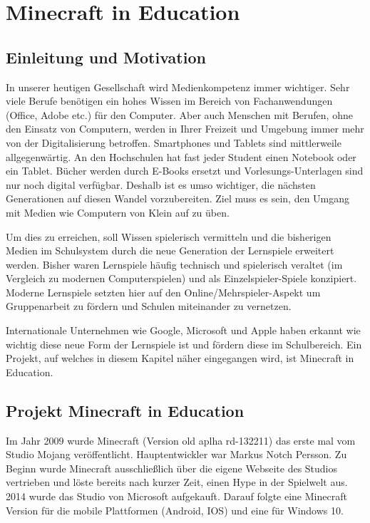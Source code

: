\chapter{Minecraft in Education}
\section{Einleitung und Motivation}
In unserer heutigen Gesellschaft wird Medienkompetenz immer wichtiger. Sehr viele Berufe benötigen ein hohes Wissen im Bereich von Fachanwendungen (Office, Adobe etc.) für den Computer. 
Aber auch Menschen mit Berufen, ohne den Einsatz von Computern, werden in Ihrer Freizeit und Umgebung immer mehr von der Digitalisierung betroffen.
Smartphones und Tablets sind mittlerweile allgegenwärtig. An den Hochschulen hat fast jeder Student einen Notebook oder ein Tablet.
Bücher werden durch E-Books ersetzt und Vorlesungs-Unterlagen sind nur noch digital verfügbar. Deshalb ist es umso wichtiger, die nächsten Generationen auf diesen Wandel vorzubereiten. 
Ziel muss es sein, den Umgang mit Medien wie Computern von Klein auf zu üben.

Um dies zu erreichen, soll Wissen spielerisch vermitteln und die bisherigen Medien im Schulsystem durch die neue Generation der Lernspiele erweitert werden.
Bisher waren Lernspiele häufig technisch und spielerisch veraltet (im Vergleich zu modernen Computerspielen) und als Einzelspieler-Spiele konzipiert. Moderne Lernspiele setzten hier auf den Online/Mehrspieler-Aspekt um Gruppenarbeit zu fördern und Schulen miteinander zu vernetzen.

Internationale Unternehmen wie Google, Microsoft und Apple haben erkannt wie wichtig diese neue Form der Lernspiele ist und fördern diese im Schulbereich.
Ein Projekt, auf welches in diesem Kapitel näher eingegangen wird, ist Minecraft in Education.

\section{Projekt Minecraft in Education}

Im Jahr 2009 wurde Minecraft (Version old aplha rd-132211) das erste mal vom
Studio Mojang veröffentlicht. Hauptentwickler war Markus Notch Persson. Zu Beginn wurde Minecraft
ausschließlich über die eigene Webseite des Studios vertrieben und löste bereits nach kurzer Zeit,
einen Hype in der Spielwelt aus. 2014 wurde das Studio von Microsoft aufgekauft. Darauf folgte eine Minecraft Version für die mobile Plattformen (Android, IOS) und eine für Windows 10.
\cite{WikiMinecraft}\cite{HeiseMicrosoft}

